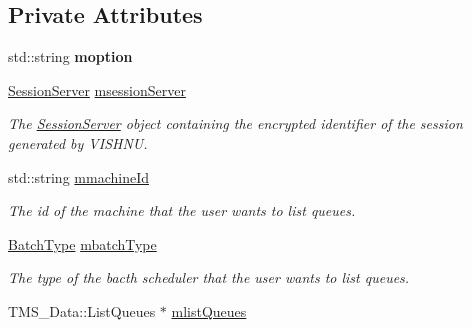 \subsection*{Private Attributes}
\begin{DoxyCompactItemize}
\item 
\hypertarget{classListQueuesServer_abf9127ca126d9dfd793a4e6c50ca6486}{
std::string {\bfseries moption}}
\label{classListQueuesServer_abf9127ca126d9dfd793a4e6c50ca6486}

\item 
\hypertarget{classListQueuesServer_afbacebe68874971368ee1e8ab3a144dc}{
\hyperlink{classSessionServer}{SessionServer} \hyperlink{classListQueuesServer_afbacebe68874971368ee1e8ab3a144dc}{msessionServer}}
\label{classListQueuesServer_afbacebe68874971368ee1e8ab3a144dc}

\begin{DoxyCompactList}\small\item\em The \hyperlink{classSessionServer}{SessionServer} object containing the encrypted identifier of the session generated by VISHNU. \item\end{DoxyCompactList}\item 
\hypertarget{classListQueuesServer_a2702f2dba56603b874f625fc47d5d73e}{
std::string \hyperlink{classListQueuesServer_a2702f2dba56603b874f625fc47d5d73e}{mmachineId}}
\label{classListQueuesServer_a2702f2dba56603b874f625fc47d5d73e}

\begin{DoxyCompactList}\small\item\em The id of the machine that the user wants to list queues. \item\end{DoxyCompactList}\item 
\hypertarget{classListQueuesServer_a2d908db495353d8086b16fbb10d8d4f6}{
\hyperlink{utilVishnu_8hpp_a864d748e7097d176552dd4c7635016ea}{BatchType} \hyperlink{classListQueuesServer_a2d908db495353d8086b16fbb10d8d4f6}{mbatchType}}
\label{classListQueuesServer_a2d908db495353d8086b16fbb10d8d4f6}

\begin{DoxyCompactList}\small\item\em The type of the bacth scheduler that the user wants to list queues. \item\end{DoxyCompactList}\item 
\hypertarget{classListQueuesServer_a49d392919bc0dba8a8821b6edd7e3efb}{
TMS\_\-Data::ListQueues $\ast$ \hyperlink{classListQueuesServer_a49d392919bc0dba8a8821b6edd7e3efb}{mlistQueues}}
\label{classListQueuesServer_a49d392919bc0dba8a8821b6edd7e3efb}


\end{DoxyCompactItemize}
